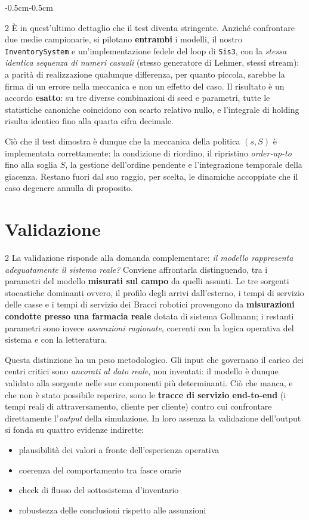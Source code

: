 \documentclass{article}
\begin{document}
\begin{adjustwidth}{-0.5cm}{-0.5cm}
\begin{multicols}{2}
È in quest'ultimo dettaglio che il test diventa stringente. Anziché confrontare due medie
campionarie, si pilotano \textbf{entrambi} i modelli, il nostro \texttt{InventorySystem}
e un'implementazione fedele del loop di \texttt{Sis3}, con la \emph{stessa identica sequenza di
numeri casuali} (stesso generatore di Lehmer, stessi stream): a parità di realizzazione qualunque
differenza, per quanto piccola, sarebbe la firma di un errore nella meccanica e non un effetto del
caso. Il risultato è un accordo \textbf{esatto}: su tre diverse combinazioni di seed e parametri,
tutte le statistiche canoniche coincidono con scarto relativo nullo, e l'integrale di holding
risulta identico fino alla quarta cifra decimale.

Ciò che il test dimostra è dunque che la meccanica della politica $(s,S)$ è implementata
correttamente: la condizione di riordino, il ripristino \emph{order-up-to} fino alla soglia $S$, la
gestione dell'ordine pendente e l'integrazione temporale della giacenza. Restano fuori dal suo
raggio, per scelta, le dinamiche accoppiate che il caso degenere annulla di proposito.
\end{multicols}
\newpage
\section{Validazione}
\begin{multicols}{2}
La validazione risponde alla domanda complementare: \emph{il modello rappresenta adeguatamente il
sistema reale?} Conviene affrontarla distinguendo, tra i parametri del modello 
\textbf{misurati sul campo} da quelli assunti. Le tre sorgenti stocastiche dominanti ovvero, il
profilo degli arrivi dall'esterno, i tempi di servizio delle casse e i
tempi di servizio dei Bracci robotici provengono da \textbf{misurazioni condotte presso
una farmacia reale} dotata di sistema Gollmann; i restanti parametri sono invece \emph{assunzioni
ragionate}, coerenti con la logica operativa del sistema e con la letteratura.

Questa distinzione ha un peso metodologico. Gli input che governano il carico dei centri critici sono \emph{ancorati al
dato reale}, non inventati: il modello è dunque validato alla sorgente nelle sue componenti più
determinanti. Ciò che manca, e che non è stato possibile reperire, sono le \textbf{tracce di
servizio end-to-end} (i tempi reali di attraversamento, cliente per cliente) contro cui confrontare
direttamente l'\emph{output} della simulazione. In loro assenza la validazione dell'output si fonda
su quattro evidenze indirette: 
\begin{itemize}
    \item plausibilità dei valori a fronte dell'esperienza operativa
    \item coerenza del comportamento tra fasce orarie
    \item check di flusso del sottosistema d'inventario
    \item robustezza delle conclusioni rispetto alle assunzioni
\end{itemize}


\end{multicols}
\end{adjustwidth}
\end{document}
